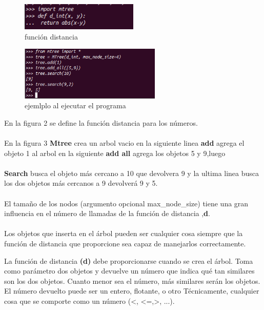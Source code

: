 \documentclass[a4paper]{article}
\begin{document}
\begin{figure}[H]
  \centering
  \includegraphics[width=0.5\textwidth]{imagenes/Captura de pantalla de 2021-12-15 23-51-51.png}
  \caption{función distancia}
\end{figure}

\begin{figure}[H]
  \centering
  \includegraphics[width=0.6\textwidth]{imagenes/test.png}
  \caption{ejemlplo al ejecutar el programa}
\end{figure}

\noindent
En la figura 2 se  define la función distancia para los números.\\\\En la figura 3
\textbf{Mtree} crea un arbol vacio en la siguiente linea  \textbf{add }agrega el objeto 1 al arbol en la siguiente  \textbf{add all} agrega los objetos 5 y 9,luego \\\\ \textbf{Search} busca el objeto más cercano a 10 que devolvera 9
y la ultima linea busca los dos objetos más cercanos a 9 devolverá 9 y 5.
\\
\\


El tamaño de los nodos (argumento opcional max\_node\_size) tiene una gran influencia en el número de llamadas de la función de distancia ,\textbf{d}.
\\
\\
Los objetos que inserta en el árbol pueden ser cualquier cosa siempre que la función de distancia que proporcione sea capaz de manejarlos correctamente.

La función de distancia \textbf{(d)} debe proporcionarse cuando se crea el árbol. Toma como parámetro dos objetos y devuelve un número que indica qué tan similares son los dos objetos. Cuanto menor sea el número, más similares serán los objetos. El número devuelto puede ser un entero, flotante, o otro Técnicamente, cualquier cosa que se comporte como un número (<, <=,>, ...).
\end{document}
